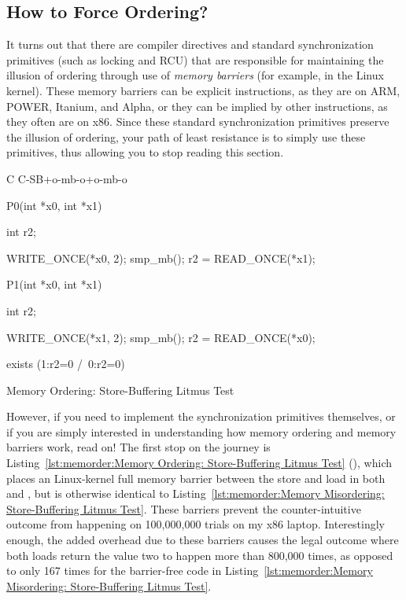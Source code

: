 \subsection{How to Force Ordering?}
\label{sec:memorder:How to Force Ordering?}

It turns out that there are compiler directives and standard
synchronization primitives (such as locking and RCU)
that are responsible for maintaining the illusion of ordering through use of
\emph{memory barriers} (for example,  in the Linux kernel).
These memory barriers can be explicit instructions, as they are on
ARM, POWER, Itanium, and Alpha, or they can be implied by other instructions,
as they often are on x86.
Since these standard synchronization primitives preserve the illusion of
ordering, your path of least resistance is to simply use these primitives,
thus allowing you to stop reading this section.

\begin{listing}[tbp]
{ \scriptsize
\begin{verbbox}[\LstLineNo]
C C-SB+o-mb-o+o-mb-o
{
}

P0(int *x0, int *x1)
{
  int r2;

  WRITE_ONCE(*x0, 2);
  smp_mb();
  r2 = READ_ONCE(*x1);
}


P1(int *x0, int *x1)
{
  int r2;

  WRITE_ONCE(*x1, 2);
  smp_mb();
  r2 = READ_ONCE(*x0);
}

exists (1:r2=0 /\ 0:r2=0)
\end{verbbox}
}
\centering
\theverbbox
\caption{Memory Ordering: Store-Buffering Litmus Test}
\label{lst:memorder:Memory Ordering: Store-Buffering Litmus Test}
\end{listing}

However, if you need to implement the synchronization primitives
themselves, or if you are simply interested in understanding how memory
ordering and memory barriers work, read on!
The first stop on the journey is
Listing~\ref{lst:memorder:Memory Ordering: Store-Buffering Litmus Test}
(),
which places an  Linux-kernel full memory barrier between
the store and load in both  and , but is otherwise
identical to
Listing~\ref{lst:memorder:Memory Misordering: Store-Buffering Litmus Test}.
These barriers prevent the counter-intuitive outcome from happening
on 100,000,000 trials on my x86 laptop.
Interestingly enough, the added overhead due to these barriers causes the
legal outcome where both loads return the value two to happen more
than 800,000 times, as opposed to only 167 times for the
barrier-free code in
Listing~\ref{lst:memorder:Memory Misordering: Store-Buffering Litmus Test}.

